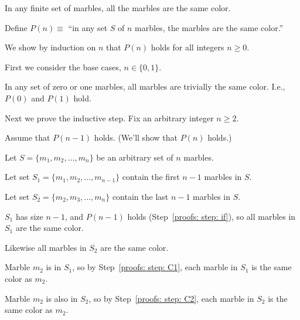 \begin{theorem}\label{proofs: thm: marbles}
  In any finite set of marbles, all the marbles are the same color.
\end{theorem}

\begin{longFormProof}
  \step   Define $P(n) \equiv$
  ``in any set $S$ of $n$ marbles, the marbles are the same color.''

  \step We show by induction on $n$ that $P(n)$ holds for all integers $n\ge 0$.

  \step First we consider the base cases, $n\in\{0, 1\}$.

  \step\label{proofs: step: base case}
  In any set of zero or one marbles,
  all marbles are trivially the same color.
  I.e., $P(0)$ and $P(1)$ hold.

  \begin{block}\label{proofs: block: ind step}
    \step Next we prove the inductive step.
      Fix an arbitrary integer $n\ge 2$.
    
    \begin{block}\label{proofs: block: if}
      \step\label{proofs: step: if}
      Assume that $P(n-1)$ holds.
        (We'll show that $P(n)$ holds.)

      \begin{block}\label{proofs: block: set}
        \step Let $S=\{m_1, m_2, \ldots, m_{n}\}$ be an arbitrary set of $n$ marbles.

        \step Let set $S_1 = \{m_1, m_2, \ldots, m_{n-1}\}$ contain the first $n-1$ marbles in $S$.

        \step Let set $S_2 = \{m_2, m_3, \ldots, m_{n}\}$ contain the last $n-1$ marbles in $S$.

        \step\label{proofs: step: C1}
        $S_1$ has size $n-1$, and $P(n-1)$ holds (Step~\ref{proofs: step: if}),
        so all marbles in $S_1$ are the same color.

        \step\label{proofs: step: C2}
        Likewise all marbles in $S_2$ are the same color.

        \step Marble $m_2$ is in $S_1$, so by Step~\ref{proofs: step: C1},
        each marble in $S_1$ is the same color as $m_2$.

        \step Marble $m_2$ is also in $S_2$, so by Step~\ref{proofs: step: C2},
        each marble in $S_2$ is the same color as $m_2$.


\end{block}
\end{block}
\end{block}
\end{longFormProof}
